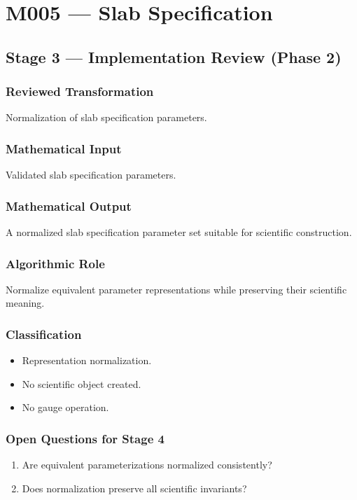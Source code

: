 \chapter{M005 --- Slab Specification}

\section{Stage 3 --- Implementation Review (Phase 2)}

\subsection{Reviewed Transformation}

Normalization of slab specification parameters.

\subsection{Mathematical Input}

Validated slab specification parameters.

\subsection{Mathematical Output}

A normalized slab specification parameter set suitable for scientific
construction.

\subsection{Algorithmic Role}

Normalize equivalent parameter representations while preserving their
scientific meaning.

\subsection{Classification}

\begin{itemize}
\item Representation normalization.
\item No scientific object created.
\item No gauge operation.
\end{itemize}

\subsection{Open Questions for Stage 4}

\begin{enumerate}
\item Are equivalent parameterizations normalized consistently?
\item Does normalization preserve all scientific invariants?
\end{enumerate}
